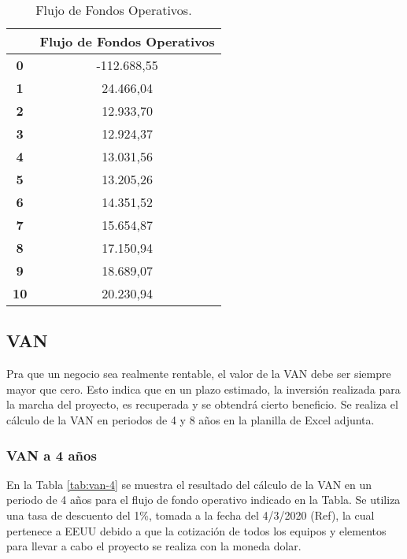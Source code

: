 \begin{table}[H]
  \small
  \centering
    \begin{tabular}{|c|c|}
    \hline
    \rowcolor[rgb]{ .773,  .851,  .945} \multicolumn{1}{|l|}{\textbf{Periodo}} & \multicolumn{1}{l|}{\textbf{Flujo de Fondos Operativos}} \bigstrut\\
    \hline
    \textbf{0} & -112.688,55 \bigstrut\\
    \hline
    \textbf{1} & 24.466,04 \bigstrut\\
    \hline
    \textbf{2} & 12.933,70 \bigstrut\\
    \hline
    \textbf{3} & 12.924,37 \bigstrut\\
    \hline
    \textbf{4} & 13.031,56 \bigstrut\\
    \hline
    \textbf{5} & 13.205,26 \bigstrut\\
    \hline
    \textbf{6} & 14.351,52 \bigstrut\\
    \hline
    \textbf{7} & 15.654,87 \bigstrut\\
    \hline
    \textbf{8} & 17.150,94 \bigstrut\\
    \hline
    \textbf{9} & 18.689,07 \bigstrut\\
    \hline
    \textbf{10} & 20.230,94 \bigstrut\\
    \hline
    \end{tabular}%
     \caption{Flujo de Fondos Operativos.}
  \label{tab:flujo-fondos-operativos}%
\end{table}%




\subsection{VAN}

Pra que un negocio sea realmente rentable, el valor de la VAN debe ser siempre mayor que cero. Esto indica que en un plazo estimado, la inversión realizada para la marcha del proyecto, es recuperada y se obtendrá cierto beneficio. Se realiza el cálculo de la VAN en periodos de 4 y 8 años en la planilla de Excel adjunta.

\subsubsection{VAN a 4 años}

En la Tabla \ref{tab:van-4} se muestra el resultado del cálculo de la VAN en un periodo de 4 años para el flujo de fondo operativo indicado en la Tabla. Se utiliza una tasa de descuento del  1\%, tomada a la fecha del 4/3/2020 (Ref), la cual pertenece a EEUU debido a que la cotización de todos los equipos y elementos para llevar a cabo el proyecto se realiza con la moneda dolar.

